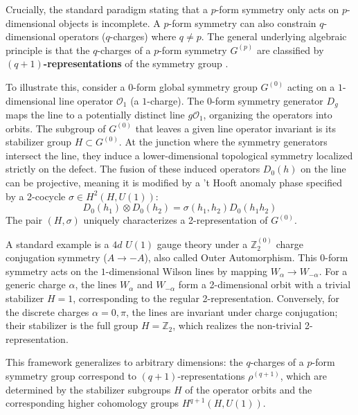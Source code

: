 \documentclass[aps,preprint,nofootinbib,preprintnumbers,eqsecnum,superscriptaddress]{revtex4}
\numberwithin{equation}{section}
\begin{document}
Crucially, the standard paradigm stating that a $p$-form symmetry only acts on $p$-dimensional objects is incomplete. A $p$-form symmetry can also constrain $q$-dimensional operators ($q$-charges) where $q \neq p$. The general underlying algebraic principle is that the $q$-charges of a $p$-form symmetry $G^{(p)}$ are classified by \textbf{$(q+1)$-representations} of the symmetry group \cite{schafernameki2023ictplecturesnoninvertiblegeneralized}. 

To illustrate this, consider a $0$-form global symmetry group $G^{(0)}$ acting on a $1$-dimensional line operator $\mathcal{O}_1$ (a $1$-charge). The $0$-form symmetry generator $D_g$ maps the line to a potentially distinct line $g\mathcal{O}_1$, organizing the operators into orbits. The subgroup of $G^{(0)}$ that leaves a given line operator invariant is its stabilizer group $H \subset G^{(0)}$. At the junction where the symmetry generators intersect the line, they induce a lower-dimensional topological symmetry localized strictly on the defect. The fusion of these induced operators $D_0(h)$ on the line can be projective, meaning it is modified by a 't Hooft anomaly phase specified by a 2-cocycle $\sigma \in H^2(H, U(1))$:\begin{equation}D_0(h_1) \otimes D_0(h_2) = \sigma(h_1, h_2) D_0(h_1 h_2)\end{equation}The pair $(H, \sigma)$ uniquely characterizes a 2-representation of $G^{(0)}$.

\begin{tcolorbox}[colback=green!5!white, colframe=green!75!black, title={Example: Free Maxwell in $4d$}]
    A standard example is a $4d$ $U(1)$ gauge theory under a $\mathbb{Z}_2^{(0)}$ charge conjugation symmetry ($A \to -A$), also called Outer Automorphism. This $0$-form symmetry acts on the $1$-dimensional Wilson lines by mapping $W_\alpha \to W_{-\alpha}$. For a generic charge $\alpha$, the lines $W_\alpha$ and $W_{-\alpha}$ form a 2-dimensional orbit with a trivial stabilizer $H = 1$, corresponding to the regular 2-representation. Conversely, for the discrete charges $\alpha = 0, \pi$, the lines are invariant under charge conjugation; their stabilizer is the full group $H = \mathbb{Z}_2$, which realizes the non-trivial 2-representation.
\end{tcolorbox}


This framework generalizes to arbitrary dimensions: the $q$-charges of a $p$-form symmetry group correspond to $(q+1)$-representations $\rho^{(q+1)}$, which are determined by the stabilizer subgroups $H$ of the operator orbits and the corresponding higher cohomology groups $H^{q+1}(H, U(1))$.
  
\end{document}
